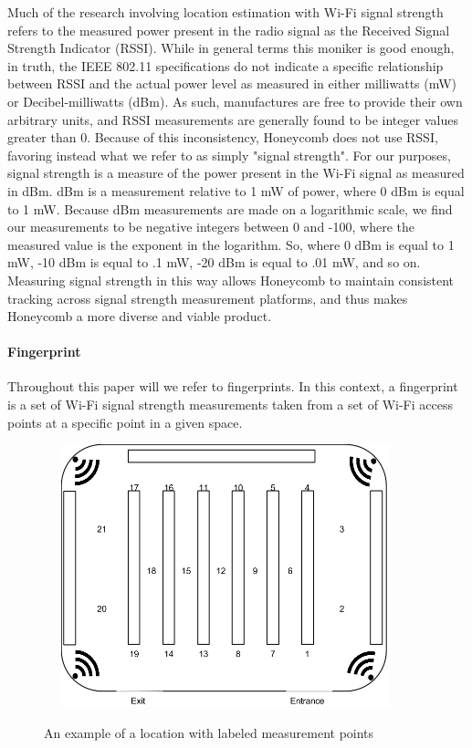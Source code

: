 Much of the research involving location estimation with Wi-Fi signal strength refers to the measured power present in the radio signal as the Received Signal Strength Indicator (RSSI). While in general terms this moniker is good enough, in truth, the IEEE 802.11 specifications \cite{ieee802.11} do not indicate a specific relationship between RSSI and the actual power level as measured in either milliwatts (mW) or Decibel-milliwatts (dBm). As such, manufactures are free to provide their own arbitrary units, and RSSI measurements are generally found to be integer values greater than 0. Because of this inconsistency, Honeycomb does not use RSSI, favoring instead what we refer to as simply "signal strength". For our purposes, signal strength is a measure of the power present in the Wi-Fi signal as measured in dBm. dBm is a measurement relative to 1 mW of power, where 0 dBm is equal to 1 mW. Because dBm measurements are made on a logarithmic scale, we find our measurements to be negative integers between 0 and -100, where the measured value is the exponent in the logarithm. So, where 0 dBm is equal to 1 mW, -10 dBm is equal to .1 mW, -20 dBm is equal to .01 mW, and so on. Measuring signal strength in this way allows Honeycomb to maintain consistent tracking across signal strength measurement platforms, and thus makes Honeycomb a more diverse and viable product.


\paragraph{Fingerprint}
Throughout this paper will we refer to fingerprints. In this context, a fingerprint is a set of Wi-Fi signal strength measurements taken from a set of Wi-Fi access points at a specific point in a given space. 

\begin{figure}[htb] %
	\begin{center}
		\ \includegraphics[width=4in,height=3in]{ExampleLocation.png}
		\caption{An example of a location with labeled measurement points}
		\label{storeexample}
	\end{center}
\end{figure}


